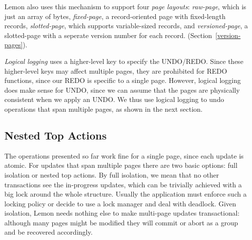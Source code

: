\documentclass[10pt,letterpaper,twocolumn,english]{article}
\newcommand{\yad}{Lemon\xspace}
\begin{document}

\yad also uses this mechanism to support four {\em page layouts}: 
{\em raw-page}, which is just an array of
bytes, {\em fixed-page}, a record-oriented page with fixed-length records,
{\em slotted-page}, which supports variable-sized records, and 
{\em versioned-page},  a slotted-page with a seperate version number for 
each record. (Section~\ref{version-pages}).  

{\em Logical logging} uses a higher-level key to specify the
UNDO/REDO.  Since these higher-level keys may affect multiple pages,
they are prohibited for REDO functions, since our REDO is specific to
a single page.  However, logical logging does make sense for UNDO,
since we can assume that the pages are physically consistent when we
apply an UNDO.  We thus use logical logging to undo operations that
span multiple pages, as shown in the next section.




\subsection{Nested Top Actions}
\label{nested-top-actions}

The operations presented so far work fine for a single page, since
each update is atomic.  For updates that span multiple pages there 
are two basic options: full isolation or nested top actions.
By full isolation, we mean that no other transactions see the
in-progress updates, which can be trivially achieved with a big lock
around the whole structure.  Usually the application must enforce 
such a locking policy or decide to use a lock manager and deal with 
deadlock.  Given isolation, \yad needs nothing else to
make multi-page updates transactional: although many pages might be
modified they will commit or abort as a group and be recovered
accordingly.
\end{document}
